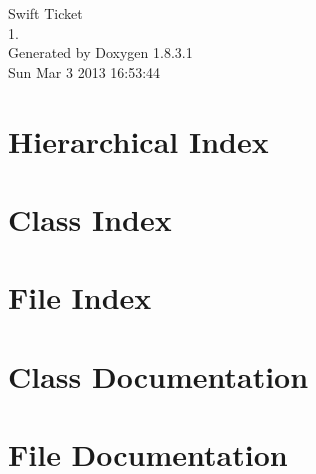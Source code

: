 \documentclass{book}
\begin{document}
\hypersetup{pageanchor=false,citecolor=blue}
\begin{titlepage}
\vspace*{7cm}
\begin{center}
{\Large Swift Ticket \\[1ex]\large 1. }\\
\vspace*{1cm}
{\large Generated by Doxygen 1.8.3.1}\\
\vspace*{0.5cm}
{\small Sun Mar 3 2013 16:53:44}\\
\end{center}
\end{titlepage}
\clearemptydoublepage
{}
\tableofcontents
\clearemptydoublepage
{}
\hypersetup{pageanchor=true,citecolor=blue}
\chapter{Hierarchical Index}

\chapter{Class Index}

\chapter{File Index}

\chapter{Class Documentation}
















\chapter{File Documentation}

















\printindex
\end{document}
